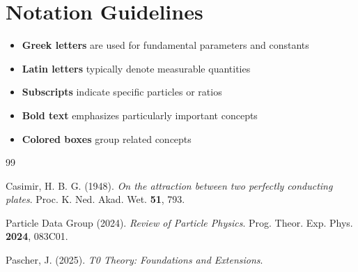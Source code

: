 	\begin{table}[htbp]
		\centering
		\caption{Important formulas and relations}
	\end{table}
	
	\section*{Notation Guidelines}
	
	\begin{itemize}
		\item \textbf{Greek letters} are used for fundamental parameters and constants
		\item \textbf{Latin letters} typically denote measurable quantities
		\item \textbf{Subscripts} indicate specific particles or ratios
		\item \textbf{Bold text} emphasizes particularly important concepts
		\item \textbf{Colored boxes} group related concepts
	\end{itemize}
	
	\begin{thebibliography}{99}
		
		Casimir, H. B. G. (1948). \textit{On the attraction between two perfectly conducting plates}.
		Proc. K. Ned. Akad. Wet. \textbf{51}, 793.
		
		Particle Data Group (2024). \textit{Review of Particle Physics}.
		Prog. Theor. Exp. Phys. \textbf{2024}, 083C01.
		
		Pascher, J. (2025). \textit{T0 Theory: Foundations and Extensions}.

	\end{thebibliography}
